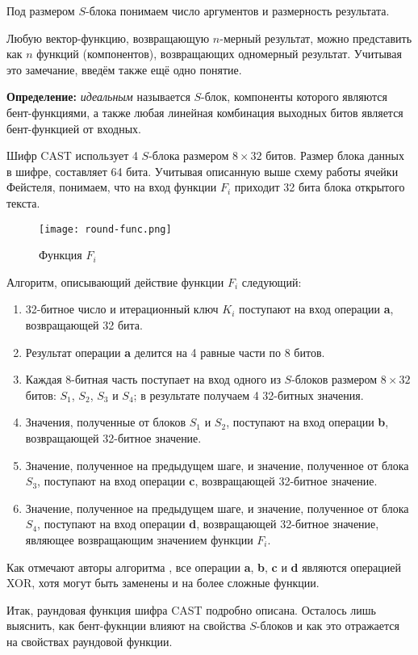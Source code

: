 \documentclass[12pt, a4paper, reqno]{article}
\begin{document}
    Под размером $S$-блока понимаем число аргументов и размерность результата.

    Любую вектор-функцию, возвращающую $n$-мерный результат, можно представить как $n$ функций
    (компонентов), возвращающих одномерный результат. Учитывая это замечание, введём также ещё одно
    понятие.

    \textbf{Определение:} \textit{идеальным} называется $S$-блок, компоненты которого являются
    бент-функциями, а также любая линейная комбинация выходных битов является бент-функцией от
    входных.

    Шифр CAST использует 4 $S$-блока размером $8 \times 32$ битов. Размер блока данных в шифре,
    составляет 64 бита. Учитывая описанную выше схему работы ячейки Фейстеля, понимаем, что на вход
    функции $F_i$ приходит 32 бита блока открытого текста.

    \begin{wrapfigure}{r}{0.3\textwidth}
        \centering
        \texttt{[image: round-func.png]}
        \caption{Функция $F_i$}
    \end{wrapfigure}

    Алгоритм, описывающий действие функции $F_i$ следующий:
    \begin{enumerate}
        \item 32-битное число и итерационный ключ $K_i$ поступают на вход операции \textbf{a},
              возвращающей 32 бита.
        \item Результат операции \textbf{a} делится на 4 равные части по 8 битов.
        \item Каждая 8-битная часть поступает на вход одного из $S$-блоков размером
              $8 \times 32$ битов: $S_1$, $S_2$, $S_3$ и $S_4$; в результате получаем 4 32-битных
              значения.
        \item Значения, полученные от блоков $S_1$ и $S_2$, поступают на вход операции \textbf{b},
              возвращающей 32-битное значение.
        \item Значение, полученное на предыдущем шаге, и значение, полученное от блока $S_3$,
              поступают на вход операции \textbf{c}, возвращающей 32-битное значение.
        \item Значение, полученное на предыдущем шаге, и значение, полученное от блока $S_4$,
              поступают на вход операции \textbf{d}, возвращающей 32-битное значение, являющее
              возвращающим значением функции $F_i$.
    \end{enumerate}

    Как отмечают авторы алгоритма \cite{cast}, все операции \textbf{a}, \textbf{b}, \textbf{c} и
    \textbf{d} являются операцией XOR, хотя могут быть заменены и на более сложные функции.

    Итак, раундовая функция шифра CAST подробно описана. Осталось лишь выяснить, как бент-фукнции
    влияют на свойства $S$-блоков и как это отражается на свойствах раундовой функции.

\newpage
\printbibliography[heading=bibintoc, title={Список литературы}]
\end{document}
